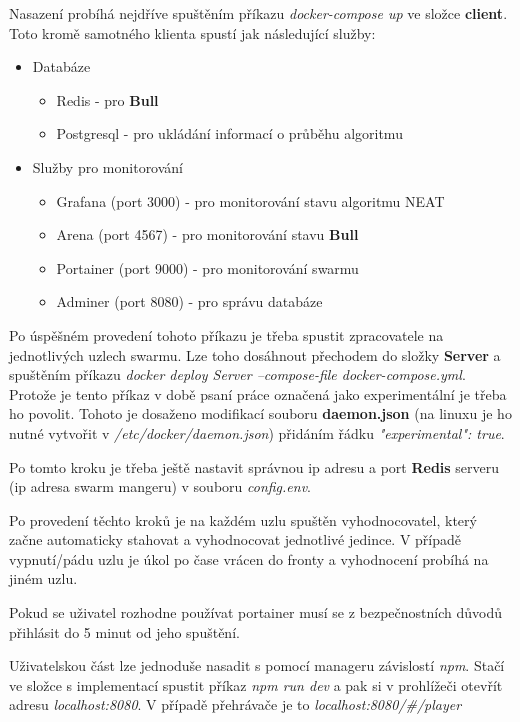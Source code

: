 Nasazení probíhá nejdříve spuštěním příkazu \emph{docker-compose up} ve složce \textbf{client}. Toto kromě samotného klienta spustí jak následující služby:
\begin{itemize}
	\item Databáze
	\begin{itemize}
		\item Redis - pro \textbf{Bull}
		\item Postgresql - pro ukládání informací o průběhu algoritmu
	\end{itemize}
	\item Služby pro monitorování
	\begin{itemize}
		\item Grafana (port 3000) - pro monitorování stavu algoritmu NEAT
		\item Arena (port 4567) - pro monitorování stavu \textbf{Bull}
		\item Portainer (port 9000) - pro monitorování swarmu
		\item Adminer (port 8080) - pro správu databáze
	\end{itemize}
\end{itemize}
Po úspěšném provedení tohoto příkazu je třeba spustit zpracovatele na jednotlivých uzlech swarmu. Lze toho dosáhnout přechodem do složky \textbf{Server} a spuštěním příkazu \emph{docker deploy Server --compose-file docker-compose.yml}. Protože je tento příkaz v době psaní práce označená jako experimentální je třeba ho povolit. Tohoto je dosaženo modifikací souboru \textbf{daemon.json} (na linuxu je ho nutné vytvořit v \emph{/etc/docker/daemon.json}) přidáním řádku \emph{"experimental": true}.

Po tomto kroku je třeba ještě nastavit správnou ip adresu a port \textbf{Redis} serveru (ip adresa swarm mangeru) v souboru \emph{config.env}.

Po provedení těchto kroků je na každém uzlu spuštěn vyhodnocovatel, který začne automaticky stahovat a vyhodnocovat jednotlivé jedince. V případě vypnutí/pádu uzlu je úkol po čase vrácen do fronty a vyhodnocení probíhá na jiném uzlu.

Pokud se uživatel rozhodne používat portainer musí se z bezpečnostních důvodů přihlásit do 5 minut od jeho spuštění.

Uživatelskou část lze jednoduše nasadit s pomocí manageru závislostí \emph{npm}. Stačí ve složce s implementací spustit příkaz \emph{npm run dev} a pak si v prohlížeči otevřít adresu \emph{localhost:8080}. V případě přehrávače je to \emph{localhost:8080/\#/player}


